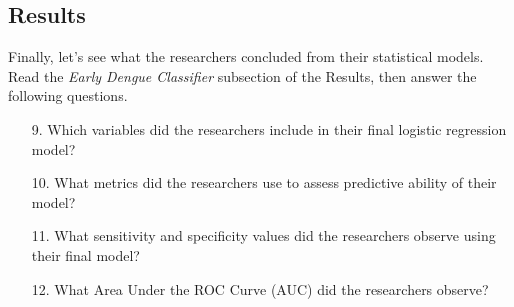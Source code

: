 \documentclass[11pt]{article}
\begin{document}
\subsection*{Results}

Finally, let's see what the researchers concluded from their statistical models. Read the \textit{Early Dengue Classifier} subsection of the Results, then answer the following questions.

\begin{enumerate}
    \item[9.] Which variables did the researchers include in their final logistic regression model?
    
    \item[10.] What metrics did the researchers use to assess predictive ability of their model?
    
    \item[11.] What sensitivity and specificity values did the researchers observe using their final model?
    
    \item[12.] What Area Under the ROC Curve (AUC) did the researchers observe?
\end{enumerate}
\end{document}
